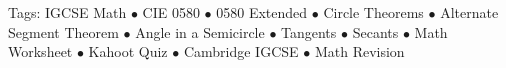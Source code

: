\documentclass[11pt,a4paper]{article}
\begin{document}
\vspace{14pt}
\begin{center}
  \sffamily\scriptsize\textcolor{textmuted}{
    Tags: IGCSE Math $\bullet$ CIE 0580 $\bullet$ 0580 Extended $\bullet$ Circle Theorems $\bullet$ Alternate Segment Theorem $\bullet$ Angle in a Semicircle $\bullet$ Tangents $\bullet$ Secants $\bullet$ Math Worksheet $\bullet$ Kahoot Quiz $\bullet$ Cambridge IGCSE $\bullet$ Math Revision
  }
\end{center}
\end{document}
